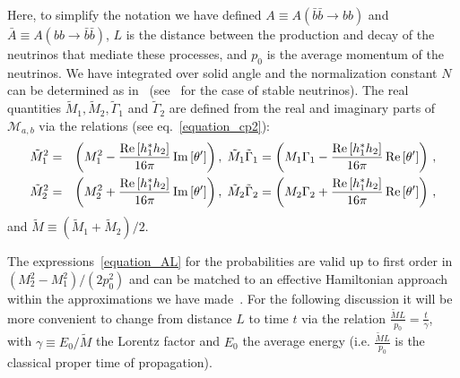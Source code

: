 \documentclass[11pt,a4paper]{article}
\providecommand{\proarrow}[0]{\rightarrow}
\providecommand{\proname}[2]{#1 \proarrow #2}
\providecommand{\mire}[1]{{\rm Re} \left[ #1 \right]}
\providecommand{\miim}[1]{{\rm Im} \left[ #1 \right]}
\providecommand{\cpm}[0]{\mathcal{M}}
\providecommand{\pmed}[0]{p_0}
\providecommand{\mmed}[0]{\tilde{M}}
\providecommand{\emed}[0]{E_0}
\providecommand{\pra}[0]{\tilde{M}_1}
\providecommand{\prb}[0]{\tilde{M}_2}
\providecommand{\pia}[0]{\tilde{\Gamma}_1}
\providecommand{\pib}[0]{\tilde{\Gamma}_2}
\begin{document}
Here, to simplify the notation we have defined $A \equiv A(\proname{\bar b \bar b}{b b})$ and $\bar A \equiv A(\proname{b b}{\bar b \bar b})$,  $L$ is the distance between the production and decay of the neutrinos that mediate these processes, and $\pmed$ is the average momentum of the neutrinos. We have integrated over solid angle and the normalization constant $N$ can be determined as in~\cite{Racker20} (see~\cite{Beuthe01} for the case of stable neutrinos). The real quantities $\pra, \prb, \pia$ and $\pib$ are defined from the real and imaginary parts of $\cpm_{a, b}$ via the relations (see eq.~\eqref{equation_cp2}):
\begin{eqnarray}
\pra^2 &=& \left(M_1^2 - \frac{\mire{h_1^* h_2}}{16 \pi} \, \miim{\theta'} \right) , \; \pra \pia = \left(M_1 \Gamma_1 - \frac{\mire{h_1^* h_2}}{16 \pi} \, \mire{\theta'} \right) \, ,\notag \\
\prb^2 &=& \left(M_2^2 + \frac{\mire{h_1^* h_2}}{16 \pi} \, \miim{\theta'} \right)  , \; \prb \pib = \left(M_2 \Gamma_2 + \frac{\mire{h_1^* h_2}}{16 \pi} \, \mire{\theta'} \right) \, ,
\end{eqnarray}
and $\mmed \equiv (\pra+\prb)/2$.

The expressions~\eqref{equation_AL} for the probabilities are valid up to first order in $(M_2^2-M_1^2)/(2 \pmed^2)$ and can be matched to an effective Hamiltonian approach within the approximations we have made~\cite{Beuthe01}.
For the following discussion it will be more convenient to change from distance $L$ to time $t$ via the relation $\tfrac{\mmed L}{\pmed}=\tfrac{t}{\gamma}$, with $\gamma \equiv \emed/\mmed$ the Lorentz factor and $\emed$ the average energy (i.e. $\tfrac{\mmed L}{\pmed}$ is the classical proper time of propagation).
\end{document}
